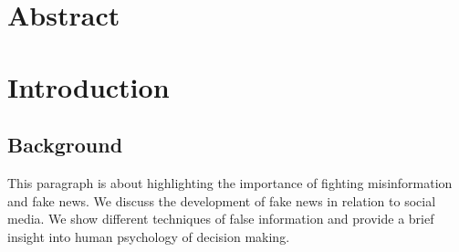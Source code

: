 \documentclass[
10pt, %
a4paper, %
oneside, %
headinclude,footinclude, %
] {book}%
\begin{document}

\chapter*{Abstract}



\clearpage
\setcounter{tocdepth}{3} %
\tableofcontents %

\listoffigures %

\listoftables %





\chapter{Introduction} \label{introduction}


\section{Background}


This paragraph is about highlighting the importance of fighting misinformation and fake news. We discuss the development of fake news in relation to social media. We show different techniques of false information and provide a brief insight into human psychology of decision making.  
\end{document}
